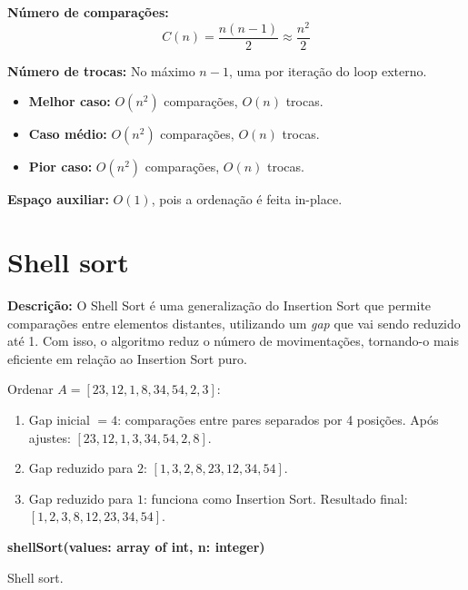 \noindent\textbf{Número de comparações:}  
\[
C(n) = \frac{n(n-1)}{2} \approx \frac{n^2}{2}
\]

\noindent\textbf{Número de trocas:}  
No máximo $n-1$, uma por iteração do loop externo.

\begin{itemize}
    \item \textbf{Melhor caso:} $O(n^2)$ comparações, $O(n)$ trocas.
    \item \textbf{Caso médio:} $O(n^2)$ comparações, $O(n)$ trocas.
    \item \textbf{Pior caso:} $O(n^2)$ comparações, $O(n)$ trocas.
\end{itemize}

\noindent\textbf{Espaço auxiliar:} $O(1)$, pois a ordenação é feita in-place.

\section{Shell sort}
\textbf{Descrição:} O Shell Sort é uma generalização do Insertion Sort que permite comparações entre elementos distantes, utilizando um \textit{gap} que vai sendo reduzido até 1. Com isso, o algoritmo reduz o número de movimentações, tornando-o mais eficiente em relação ao Insertion Sort puro.

\begin{exmp}
Ordenar $A = [23, 12, 1, 8, 34, 54, 2, 3]$:

\begin{enumerate}
    \item Gap inicial $= 4$: comparações entre pares separados por 4 posições.
    Após ajustes: $[23, 12, 1, 3, 34, 54, 2, 8]$.
    \item Gap reduzido para $2$: $[1, 3, 2, 8, 23, 12, 34, 54]$.
    \item Gap reduzido para $1$: funciona como Insertion Sort.
    Resultado final: $[1, 2, 3, 8, 12, 23, 34, 54]$.
\end{enumerate}
\end{exmp}

\begin{center}
\begin{minipage}{.9\linewidth}
\begin{algorithm}[H]
\DontPrintSemicolon
\textbf{shellSort(values: array of int, n: integer)}

\caption{Shell sort.}
\label{lab:alg-shellSort}
\end{algorithm}
\end{minipage}
\end{center}

